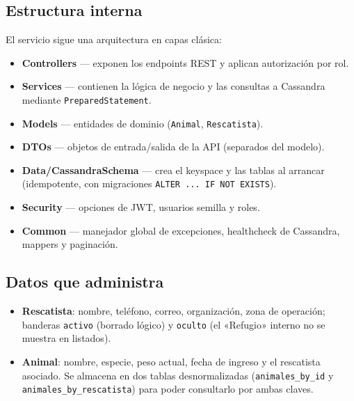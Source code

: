 \documentclass[11pt,a4paper]{article}
\begin{document}
\subsection{Estructura interna}
El servicio sigue una arquitectura en capas clásica:
\begin{itemize}[leftmargin=1.4em]
  \item \textbf{Controllers} — exponen los endpoints REST y aplican autorización por rol.
  \item \textbf{Services} — contienen la lógica de negocio y las consultas a Cassandra
        mediante \texttt{PreparedStatement}.
  \item \textbf{Models} — entidades de dominio (\texttt{Animal}, \texttt{Rescatista}).
  \item \textbf{DTOs} — objetos de entrada/salida de la API (separados del modelo).
  \item \textbf{Data/CassandraSchema} — crea el keyspace y las tablas al arrancar
        (idempotente, con migraciones \texttt{ALTER ... IF NOT EXISTS}).
  \item \textbf{Security} — opciones de JWT, usuarios semilla y roles.
  \item \textbf{Common} — manejador global de excepciones, healthcheck de Cassandra,
        mappers y paginación.
\end{itemize}

\subsection{Datos que administra}
\begin{itemize}[leftmargin=1.4em]
  \item \textbf{Rescatista}: nombre, teléfono, correo, organización, zona de
        operación; banderas \texttt{activo} (borrado lógico) y \texttt{oculto}
        (el «Refugio» interno no se muestra en listados).
  \item \textbf{Animal}: nombre, especie, peso actual, fecha de ingreso y el
        rescatista asociado. Se almacena en dos tablas desnormalizadas
        (\texttt{animales\_by\_id} y \texttt{animales\_by\_rescatista}) para poder
        consultarlo por ambas claves.
\end{itemize}
\end{document}
